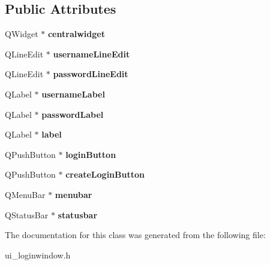 \subsection*{Public Attributes}
\begin{DoxyCompactItemize}
\item 
\mbox{\label{class_ui__login_window_a62528eb3c7be046eb07d71de5eeaa314}} 
Q\+Widget $\ast$ {\bfseries centralwidget}
\item 
\mbox{\label{class_ui__login_window_a87d7f38261eb0e592682be25e390f187}} 
Q\+Line\+Edit $\ast$ {\bfseries username\+Line\+Edit}
\item 
\mbox{\label{class_ui__login_window_a08dbc89ec69e5dd4eb9745cc78133107}} 
Q\+Line\+Edit $\ast$ {\bfseries password\+Line\+Edit}
\item 
\mbox{\label{class_ui__login_window_aea869cb5b916b30d2676bb414730f7db}} 
Q\+Label $\ast$ {\bfseries username\+Label}
\item 
\mbox{\label{class_ui__login_window_a98c7334b27530183c6fc630c7b7c5b13}} 
Q\+Label $\ast$ {\bfseries password\+Label}
\item 
\mbox{\label{class_ui__login_window_a33016c16a6c3aabbd60a1b6e3672cf2e}} 
Q\+Label $\ast$ {\bfseries label}
\item 
\mbox{\label{class_ui__login_window_a7da9d11c7ec0f288eaadc1cebdc51038}} 
Q\+Push\+Button $\ast$ {\bfseries login\+Button}
\item 
\mbox{\label{class_ui__login_window_a88c411fcdcee567fdf9404ccd691b81b}} 
Q\+Push\+Button $\ast$ {\bfseries create\+Login\+Button}
\item 
\mbox{\label{class_ui__login_window_a8d7faa4ab568e944efb913db9073ca0f}} 
Q\+Menu\+Bar $\ast$ {\bfseries menubar}
\item 
\mbox{\label{class_ui__login_window_a30cb5d37b236f0bb6e27a329c48e7e49}} 
Q\+Status\+Bar $\ast$ {\bfseries statusbar}
\end{DoxyCompactItemize}


The documentation for this class was generated from the following file\+:\begin{DoxyCompactItemize}
\item 
ui\+\_\+loginwindow.\+h\end{DoxyCompactItemize}

